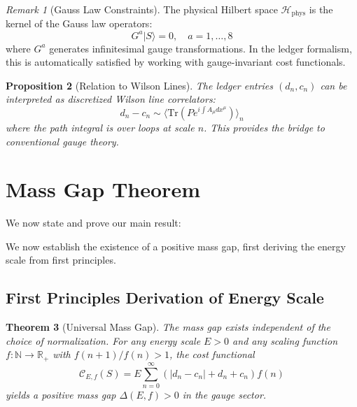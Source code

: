 \documentclass[11pt]{article}
\numberwithin{equation}{section}
\newtheorem{theorem}{Theorem}[section]
\newtheorem{proposition}[theorem]{Proposition}
\theoremstyle{definition}
\theoremstyle{remark}
\newtheorem{remark}[theorem]{Remark}
\begin{document}
\begin{remark}[Gauss Law Constraints]
The physical Hilbert space $\mathcal{H}_{\text{phys}}$ is the kernel of the Gauss law operators:
\begin{equation}
G^a |S\rangle = 0, \quad a = 1,\ldots,8
\end{equation}
where $G^a$ generates infinitesimal gauge transformations. In the ledger formalism, this is automatically satisfied by working with gauge-invariant cost functionals.
\end{remark}

\begin{proposition}[Relation to Wilson Lines]
The ledger entries $(d_n, c_n)$ can be interpreted as discretized Wilson line correlators:
\begin{equation}
d_n - c_n \sim \langle \text{Tr}(P e^{i\int A_\mu dx^\mu}) \rangle_n
\end{equation}
where the path integral is over loops at scale $n$. This provides the bridge to conventional gauge theory.
\end{proposition}

\section{Mass Gap Theorem}

We now state and prove our main result:

We now establish the existence of a positive mass gap, first deriving the energy scale from first principles.

\subsection{First Principles Derivation of Energy Scale}

\begin{theorem}[Universal Mass Gap]
The mass gap exists independent of the choice of normalization. For any energy scale $E > 0$ and any scaling function $f: \mathbb{N} \to \mathbb{R}_+$ with $f(n+1)/f(n) > 1$, the cost functional
\begin{equation}
\mathcal{C}_{E,f}(S) = E \sum_{n=0}^{\infty} \left(|d_n - c_n| + d_n + c_n\right) f(n)
\end{equation}
yields a positive mass gap $\Delta(E,f) > 0$ in the gauge sector.
\end{theorem}
\end{document}
